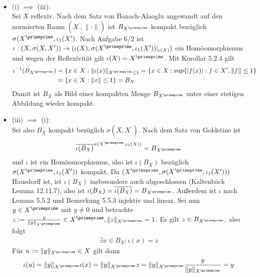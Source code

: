 \begin{solution}
\leavevmode \\
\begin{itemize}
  \item (i) $\implies$ (iii): \\
  Sei $X$ reflexiv. Nach dem Satz von Banach-Alaoglu
  angewandt auf den normierten Raum $(X^{\prime},\|\cdot\|)$ ist $B_{X^{\primeprime}}$
  kompakt bezüglich $\sigma(X^{\primeprime}, \iota_1(X^{\prime})$.
  Nach Aufgabe 6/2 ist $\iota: (X,\sigma(X,X^{\prime})) \to
  (\iota(X),\sigma(X^{\primeprime},\iota_1(X^{\prime}))|_{\iota(X)})$ ein Homöomorphismus
  und wegen der Reflexivität gilt $\iota(X) = X^{\primeprime}$.
  Mit Korollar 5.2.4 gilt
  \begin{align*}
    \iota^{-1}(B_{X^{\primeprime}}) &= \{x \in X: \|\iota(x)\|_{X^{\primeprime} \leq 1}
    = \{x \in X: \sup\{|f(x)|: f \in X^{\prime}, \|f\| \leq 1 \} \\
    &= \{x \in X: \|x\| \leq 1\} = B_X
  \end{align*}
  Damit ist $B_X$ als Bild einer kompakten Menge $B_{X^{\primeprime}}$ unter einer
  stetigen Abbildung wieder kompakt.
  \item (iii) $\implies$ (i): \\
  Sei also $B_X$ kompakt bezüglich $\sigma(X,X^{\prime})$. Nach dem Satz von Goldstine
  ist
  \begin{align*}
    \overline{\iota(B_X)}^{\sigma(X^{\primeprime},\iota_1(X))} = B_{X^{\primeprime}}
  \end{align*}
  und $\iota$ ist ein Homöomorphismus, also ist $\iota(B_X)$ bezüglich
  $\sigma(X^{\primeprime}, \iota_1(X^{\prime}))$ kompakt. Da
  $(X^{\primeprime}, \sigma(X^{\primeprime}, \iota_1(X^{\prime})))$ Hausdorff ist,
  ist $\iota(B_X)$ insbesondere auch abgeschlossen (Kaltenbäck Lemma 12.11.7),
  also ist $\iota(B_X) = \overline{\iota(B_X)} = B_{X^{\primeprime}}$.
  Außerdem ist $\iota$ nach Lemma 5.5.2 und Bemerkung 5.5.3 injektiv und linear.
  Sei nun $y \in X^{\primeprime}$ mit $y \neq 0$ und betrachte
  $z := \frac{y}{\|y\|_{X^{\primeprime}}} \in X^{\primeprime}, \|z\|_{X^{\primeprime}} = 1$.
  Es gilt $z \in B_{X^{\primeprime}}$, also folgt
  \begin{align*}
    \exists x \in B_X: \iota(x) = z
  \end{align*}
  Für $u := \|y\|_{X^{\primeprime}} \in X$ gilt dann
  \begin{align*}
    \iota(u) = \|y\|_{X^{\primeprime}}\iota(x) = \|y\|_{X^{\primeprime}}z
    = \|y\|_{X^{\primeprime}} \frac{y}{\|y\|_{X^{\primeprime}}} = y

\end{align*}
\end{itemize}
\end{solution}
